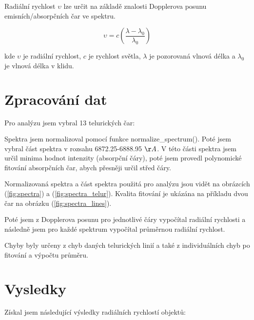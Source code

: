 \documentclass[a4paper,11pt,twocolumn]{article}
\begin{document}
        Radiální rychlost $\upsilon$ lze určit na základě znalosti Dopplerova posunu emisních/absorpčních čar ve spektru. 

        \begin{equation}
            \upsilon = c \left( \frac{\lambda - \lambda_0}{\lambda_0} \right) 
        \end{equation}

        kde $\upsilon$ je radiální rychlost, $c$ je rychlost světla, $\lambda$ je pozorovaná vlnová délka a $\lambda_0$ je vlnová délka v klidu.
        
    \section{Zpracování dat}
        Pro analýzu jsem vybral 13 telurických čar:


        \vspace{10pt}

        Spektra jsem normalizoval pomocí funkce normalize\_spectrum(). Poté jsem vybral část spektra v rozsahu 6872.25-6888.95 $\AA$. V této části spektra jsem určil minima hodnot intenzity (absorpční čáry), poté jsem provedl polynomické fitování absorpčních čar, abych přesněji určil střed čáry. 

        Normalizovaná spektra a část spektra použitá pro analýzu jsou vidět na obrázcích (\ref{fig:spectra}) a (\ref{fig:spectra_telur}). Kvalita fitování je ukázána na příkladu dvou čar na obrázku (\ref{fig:spectra_lines}).

        Poté jsem z Dopplerova posunu pro jednotlivé čáry vypočítal radiální rychlosti a následně jsem pro každé spektrum vypočítal průměrnou radiální rychlost.

        Chyby byly určeny z chyb daných telurických linií a také z individuálních chyb po fitování a výpočtu průměru. 

    \section{Vysledky}
        Získal jsem následující výsledky radiálních rychlostí objektů: 
\end{document}
